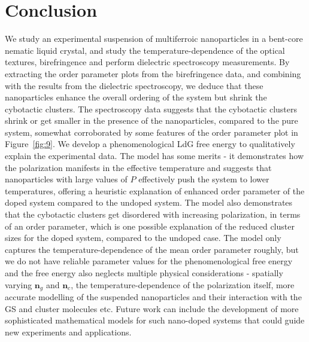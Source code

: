 \documentclass[reprint,amsfonts,amsmath,amssymb,aps,pre,floatfix,10pt]{revtex4-1}
\newcommand\n{\mathbf{n}}
\begin{document}
\section{Conclusion}
We study an experimental suspension of multiferroic nanoparticles in a bent-core nematic liquid crystal, and study the temperature-dependence of the optical textures, birefringence and perform dielectric spectroscopy measurements. By extracting the order parameter plots from the birefringence data, and combining with the results from the dielectric spectroscopy, we deduce that these nanoparticles enhance the overall ordering of the system but shrink the cybotactic clusters. The spectroscopy data suggests that the cybotactic clusters shrink or get smaller in the presence of the nanoparticles, compared to the pure system, somewhat corroborated by some features of the order parameter plot in Figure~\ref{fig:9}. We develop a phenomenological LdG free energy to qualitatively explain the experimental data. The model has some merits -  it demonstrates how the polarization manifests in the effective temperature and suggests that nanoparticles with large values of $P$ effectively push the system to lower temperatures, offering a heuristic explanation of enhanced order parameter of the doped system compared to the undoped system. The model also demonstrates that the cybotactic clusters get disordered with increasing polarization, in terms of an order parameter, which is one possible explanation of the reduced cluster sizes for the doped system, compared to the undoped case. The model only captures the temperature-dependence of the mean order parameter roughly, but we do not have reliable parameter values for the phenomenological free energy and the free energy also neglects multiple physical considerations - spatially varying $\n_g$ and $\n_c$, the temperature-dependence of the polarization itself, more accurate modelling of the suspended nanoparticles and their interaction with the GS and cluster molecules etc. Future work can include the development of more sophisticated mathematical models for such nano-doped systems that could guide new experiments and applications.
\end{document}
